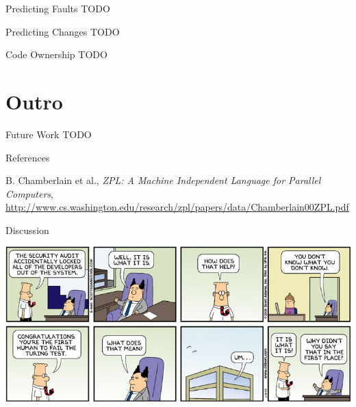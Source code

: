 
\begin{frame}{Predicting Faults}
  TODO
\end{frame}


\begin{frame}{Predicting Changes}
  TODO
\end{frame}


\begin{frame}{Code Ownership}
  TODO
\end{frame}



\section*{Outro}

\begin{frame}{Future Work}
  TODO
\end{frame}


\begin{frame}{References}
  \begin{thebibliography}{10}
    \beamertemplatearticlebibitems
    
    B. Chamberlain et al., {\em ZPL: A Machine Independent Language
      for Parallel Computers},
    \url{http://www.cs.washington.edu/research/zpl/papers/data/Chamberlain00ZPL.pdf}
  \end{thebibliography}
\end{frame}


\begin{frame}{Discussion}

  \begin{center}
    \includegraphics[width=\textwidth]{figures/dilbert-turing-test}
  \end{center}

\end{frame}

\note{
}


